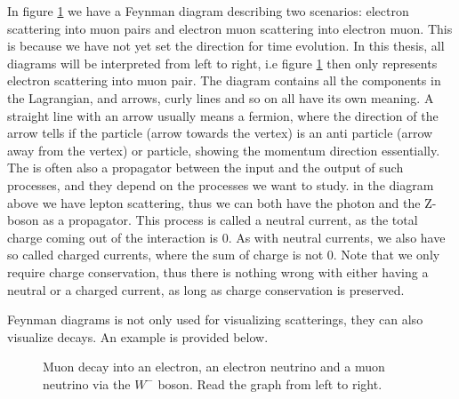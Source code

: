 In figure \ref{fig:eemm_scat} we have a Feynman diagram describing two scenarios: electron scattering into muon pairs and 
electron muon scattering into electron muon. This is because we have not yet set the direction for time evolution. In this thesis, all 
diagrams will be interpreted from left to right, i.e figure \ref{fig:eemm_scat} then only represents electron scattering into muon pair. 
The diagram contains all the components in the Lagrangian, and arrows, curly lines and so on all have its own meaning. A straight line with 
an arrow usually means a fermion, where the direction of the arrow tells if the particle (arrow towards the vertex) is an anti particle (arrow away from the vertex) 
or particle, showing the momentum direction essentially. The is often also a propagator between the input and the output of such processes, 
and they depend on the processes we want to study. in the diagram above we have lepton scattering, thus we can both have the photon and the 
Z-boson as a propagator. This process is called a neutral current\cite{Pich:819632}, as the total charge coming out of the interaction is 0. 
As with neutral currents, we also have so called charged currents, where the sum of charge is not 0. Note that we only require charge conservation,
thus there is nothing wrong with either having a neutral or a charged current, as long as charge conservation is preserved. \par 
Feynman diagrams is not only used for visualizing scatterings, they can also visualize decays. An example is provided below. 

\begin{figure}[h!]
    \centering
    \caption{Muon decay into an electron, an electron neutrino and a muon neutrino via the $W^{-}$ boson. Read the graph from left to right.}
    
    \label{fig:eemm_scat}
\end{figure}

